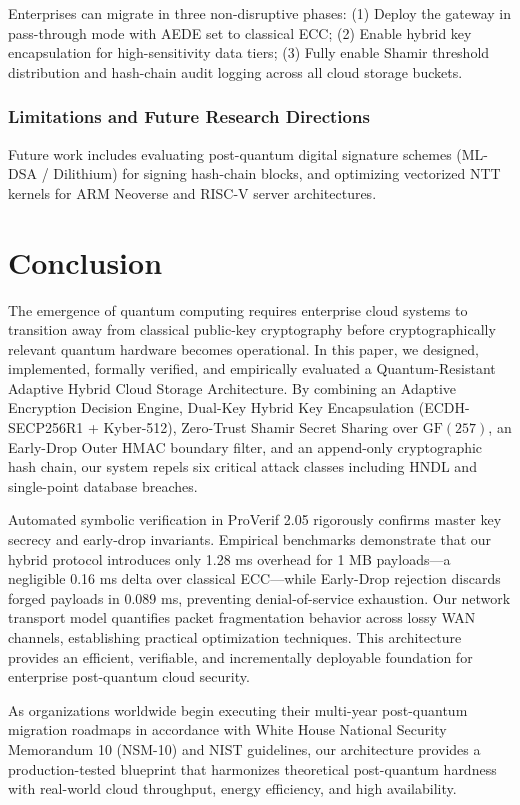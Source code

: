 \documentclass[5p,times]{elsarticle}
\begin{document}
Enterprises can migrate in three non-disruptive phases: (1) Deploy the gateway in pass-through mode with AEDE set to classical ECC; (2) Enable hybrid key encapsulation for high-sensitivity data tiers; (3) Fully enable Shamir threshold distribution and hash-chain audit logging across all cloud storage buckets.


\subsubsection{Limitations and Future Research Directions}

Future work includes evaluating post-quantum digital signature schemes (ML-DSA / Dilithium) for signing hash-chain blocks, and optimizing vectorized NTT kernels for ARM Neoverse and RISC-V server architectures.


\section{Conclusion}

The emergence of quantum computing requires enterprise cloud systems to transition away from classical public-key cryptography before cryptographically relevant quantum hardware becomes operational. In this paper, we designed, implemented, formally verified, and empirically evaluated a Quantum-Resistant Adaptive Hybrid Cloud Storage Architecture. By combining an Adaptive Encryption Decision Engine, Dual-Key Hybrid Key Encapsulation (ECDH-SECP256R1 + Kyber-512), Zero-Trust Shamir Secret Sharing over $\text{GF}(257)$, an Early-Drop Outer HMAC boundary filter, and an append-only cryptographic hash chain, our system repels six critical attack classes including HNDL and single-point database breaches.

Automated symbolic verification in ProVerif 2.05 rigorously confirms master key secrecy and early-drop invariants. Empirical benchmarks demonstrate that our hybrid protocol introduces only 1.28 ms overhead for 1 MB payloads---a negligible 0.16 ms delta over classical ECC---while Early-Drop rejection discards forged payloads in 0.089 ms, preventing denial-of-service exhaustion. Our network transport model quantifies packet fragmentation behavior across lossy WAN channels, establishing practical optimization techniques. This architecture provides an efficient, verifiable, and incrementally deployable foundation for enterprise post-quantum cloud security.

As organizations worldwide begin executing their multi-year post-quantum migration roadmaps in accordance with White House National Security Memorandum 10 (NSM-10) and NIST guidelines, our architecture provides a production-tested blueprint that harmonizes theoretical post-quantum hardness with real-world cloud throughput, energy efficiency, and high availability.
\end{document}
